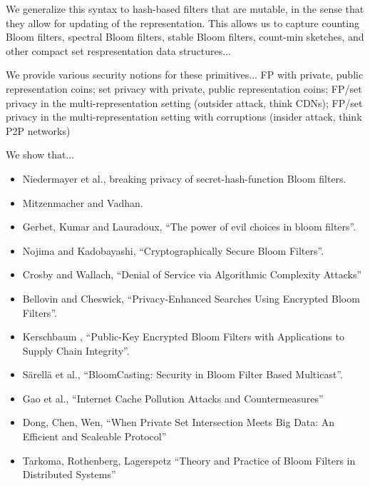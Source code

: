 We generalize this syntax to hash-based filters that are mutable, in the sense that they allow for updating of the representation.  This allows us to capture counting Bloom filters, spectral Bloom filters, stable Bloom filters, count-min sketches, and other compact set respresentation data structures...

We provide various security notions for these primitives... FP with private, public representation coins; set privacy with private, public representation coins; FP/set privacy in the multi-representation setting (outsider attack, think CDNs); FP/set privacy in the multi-representation setting with corruptions (insider attack, think P2P networks) 


We show that... 

\begin{itemize}
\item Niedermayer et al., breaking privacy of secret-hash-function Bloom filters.
\item Mitzenmacher and Vadhan.
\item Gerbet, Kumar and Lauradoux, ``The power of evil choices in bloom filters''.  
\item Nojima and Kadobayashi, ``Cryptographically Secure Bloom Filters''. 
\item Crosby and Wallach, ``Denial of Service via Algorithmic Complexity Attacks'' 
\item Bellovin and Cheswick, ``Privacy-Enhanced Searches Using Encrypted Bloom Filters''.
\item Kerschbaum , ``Public-Key Encrypted Bloom Filters with Applications to Supply Chain Integrity''.
\item S\"{a}rell\"{a} et al., ``BloomCasting: Security in Bloom Filter Based Multicast''.
\item Gao et al., ``Internet Cache Pollution Attacks and Countermeasures''
\item Dong, Chen, Wen, ``When Private Set Intersection Meets Big Data: An Efficient and Scaleable Protocol'' 
\item Tarkoma, Rothenberg, Lagerspetz ``Theory and Practice of Bloom Filters in Distributed Systems'' 
\end{itemize}










